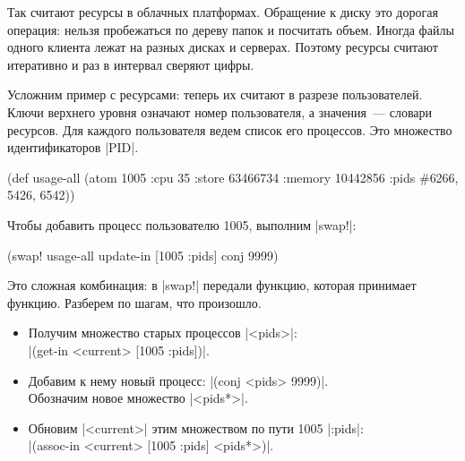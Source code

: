 
Так считают ресурсы в облачных платформах. Обращение к диску это дорогая
операция: нельзя пробежаться по дереву папок и посчитать объем. Иногда файлы
одного клиента лежат на разных дисках и серверах. Поэтому ресурсы считают
итеративно и раз в интервал сверяют цифры.


Усложним пример с ресурсами: теперь их считают в разрезе пользователей. Ключи
верхнего уровня означают номер пользователя, а значения~--- словари
ресурсов. Для каждого пользователя ведем список его процессов. Это множество
идентификаторов \spverb|PID|.

\begin{english}
  \begin{clojure}
(def usage-all
  (atom {1005 {:cpu 35
               :store 63466734
               :memory 10442856
               :pids #{6266, 5426, 6542}}}))
  \end{clojure}
\end{english}

\noindent
Чтобы добавить процесс пользователю 1005, выполним \spverb|swap!|:

\begin{english}
  \begin{clojure}
(swap! usage-all update-in [1005 :pids] conj 9999)
  \end{clojure}
\end{english}

Это сложная комбинация: в \spverb|swap!| передали функцию, которая принимает
функцию. Разберем по шагам, что произошло.

\begin{itemize}

\item
  Получим множество старых процессов \spverb|<pids>|:\\
  \spverb|(get-in <current> [1005 :pids])|.

\item
  Добавим к нему новый процесс: \spverb|(conj <pids> 9999)|.\\
  Обозначим новое множество \spverb|<pids*>|.

\item
  Обновим \spverb|<current>| этим множеством по пути 1005 \arr{} \spverb|:pids|:\\
  \spverb|(assoc-in <current> [1005 :pids] <pids*>)|.

\end{itemize}

